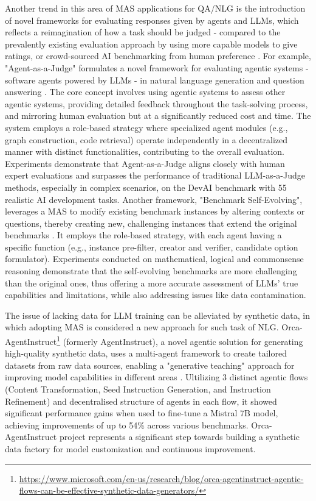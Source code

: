 \documentclass[acmsmall,nonacm]{acmart}
\begin{document}
    Another trend in this area of MAS applications for QA/NLG is the introduction of novel frameworks for evaluating responses given by agents and LLMs, which reflects a reimagination of how a task should be judged - compared to the prevalently existing evaluation approach by using more capable models to give ratings, or crowd-sourced AI benchmarking from human preference \cite{chiang2024chatbot}. For example, "Agent-as-a-Judge" formulates a novel framework for evaluating agentic systems - software agents powered by LLMs - in natural language generation and question answering \cite{zhuge2024agent}. The core concept involves using agentic systems to assess other agentic systems, providing detailed feedback throughout the task-solving process, and mirroring human evaluation but at a significantly reduced cost and time. The system employs a role-based strategy where specialized agent modules (e.g., graph construction, code retrieval) operate independently in a decentralized manner with distinct functionalities, contributing to the overall evaluation. Experiments demonstrate that Agent-as-a-Judge aligns closely with human expert evaluations and surpasses the performance of traditional LLM-as-a-Judge methods, especially in complex scenarios, on the DevAI benchmark with 55 realistic AI development tasks. Another framework, "Benchmark Self-Evolving", leverages a MAS to modify existing benchmark instances by altering contexts or questions, thereby creating new, challenging instances that extend the original benchmarks \cite{wang2024benchmark}. It employs the role-based strategy, with each agent having a specific function (e.g., instance pre-filter, creator and verifier, candidate option formulator). Experiments conducted on mathematical, logical and commonsense reasoning demonstrate that the self-evolving benchmarks are more challenging than the original ones, thus offering a more accurate assessment of LLMs' true capabilities and limitations, while also addressing issues like data contamination.

    The issue of lacking data for LLM training can be alleviated by synthetic data, in which adopting MAS is considered a new approach for such task of NLG. Orca-AgentInstruct\footnote{\url{https://www.microsoft.com/en-us/research/blog/orca-agentinstruct-agentic-flows-can-be-effective-synthetic-data-generators/}} (formerly AgentInstruct), a novel agentic solution for generating high-quality synthetic data, uses a multi-agent framework to create tailored datasets from raw data sources, enabling a "generative teaching" approach for improving model capabilities in different areas \cite{mitra2024agentinstruct}. Ultilizing 3 distinct agentic flows (Content Transformation, Seed Instruction Generation, and Instruction Refinement) and decentralised structure of agents in each flow, it showed significant performance gains when used to fine-tune a Mistral 7B model, achieving improvements of up to 54\% across various benchmarks. Orca-AgentInstruct project represents a significant step towards building a synthetic data factory for model customization and continuous improvement.
\end{document}
